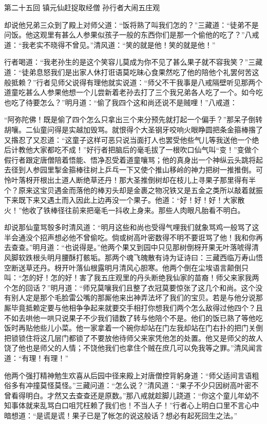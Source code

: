 \documentclass[12pt,UTF8]{ctexbook}
\begin{document}
第二十五回 镇元仙赶捉取经僧 孙行者大闹五庄观

却说他兄弟三众到了殿上对师父道：“饭将熟了叫我们怎的？”三藏道：“徒弟不是问饭。他这观里有甚么人参果似孩子一般的东西你们是那一个偷他的吃了？”八戒道：“我老实不晓得不曾见。”清风道：“笑的就是他！笑的就是他！”

行者喝道：“我老孙生的是这个笑容儿莫成为你不见了甚么果子就不容我笑？”三藏道：“徒弟息怒我们是出家人休打诳语莫吃昧心食果然吃了他的陪他个礼罢何苦这般抵赖？”行者见师父说得有理他就实说道：“师父不干我事是八戒隔壁听见那两个道童吃甚么人参果他想一个儿尝新着老孙去打了三个我兄弟各人吃了一个。如今吃也吃了待要怎么？”明月道：“偷了我四个这和尚还说不是贼哩！”八戒道：

“阿弥陀佛！既是偷了四个怎么只拿出三个来分预先就打起一个偏手？”那呆子倒转胡嚷。二仙童问得是实越加毁骂。就恨得个大圣钢牙咬响火眼睁圆把条金箍棒揝了又揝忍了又忍道：“这童子这样可恶只说当面打人也罢受他些气儿等我送他一个绝后计教他大家都吃不成！”好行者把脑后的毫毛拔了一根吹口仙气叫“变！”变做个假行者跟定唐僧陪着悟能、悟净忍受着道童嚷骂；他的真身出一个神纵云头跳将起去径到人参园里掣金箍棒往树上乒乓一下又使个推山移岭的神力把树一推推倒。可怜叶落枒开根出土道人断绝草还丹！那大圣推倒树却在枝儿上寻果子那里得有半个？原来这宝贝遇金而落他的棒刃头却是金裹之物况铁又是五金之类所以敲着就振下来既下来又遇土而入因此上边再没一个果子。他道：“好！好！好！大家散火！”他收了铁棒径往前来把毫毛一抖收上身来。那些人肉眼凡胎看不明白。

却说那仙童骂彀多时清风道：“明月这些和尚也受得气哩我们就象骂鸡一般骂了这半会通没个招声想必他不曾偷吃。倘或树高叶密数得不明不要诳骂了他！我和你再去查查。”明月道：“也说得是。”他两个果又到园中只见那树倒枒开果无叶落唬得清风脚软跌根头明月腰酥打骸垢。那两个魂飞魄散有诗为证诗曰：三藏西临万寿山悟空断送草还丹。枒开叶落仙根露明月清风心胆寒。他两个倒在尘埃语言颠倒只叫：“怎的好！怎的好！害了我五庄观里的丹头断绝我仙家的苗裔！师父来家我两个怎的回话？”明月道：“师兄莫嚷我们且整了衣冠莫要惊张了这几个和尚。这个没有别人定是那个毛脸雷公嘴的那厮他来出神弄法坏了我们的宝贝。若是与他分说那厮毕竟抵赖定要与他相争争起来就要交手相打你想我们两个怎么敌得过他四个？且不如去哄他一哄只说果子不少我们错数了转与他陪个不是。他们的饭已熟了等他吃饭时再贴他些儿小菜。他一家拿着一个碗你却站在门左我却站在门右扑的把门关倒把锁锁住将这几层门都锁了不要放他待师父来家凭他怎的处置。他又是师父的故人饶了他也是师父的人情；不饶他我们也拿住个贼在庶几可以免我等之罪。”清风闻言道：“有理！有理！”

他两个强打精神勉生欢喜从后园中径来殿上对唐僧控背躬身道：“师父适间言语粗俗多有冲撞莫怪莫怪。”三藏问道：“怎么说？”清风道：“果子不少只因树高叶密不曾看得明白。才然又去查查还是原数。”那八戒就趁脚儿跷道：“你这个童儿年幼不知事体就来乱骂白口咀咒枉赖了我们也！不当人子！”行者心上明白口里不言心中暗想道：“是谎是谎！果子已是了帐怎的说这般话？想必有起死回生之法。”
\end{document}
